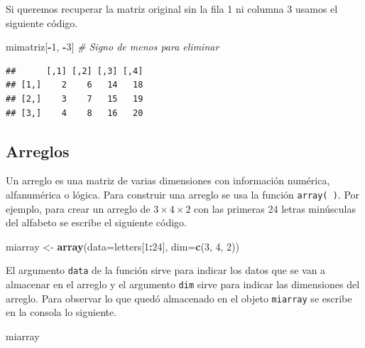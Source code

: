 \documentclass[10pt,]{krantz}
\makeatletter
\newenvironment{Shaded}{\begin{snugshade}}{\end{snugshade}}
\newcommand{\KeywordTok}[1]{\textcolor[rgb]{0.13,0.29,0.53}{\textbf{#1}}}
\newcommand{\DataTypeTok}[1]{\textcolor[rgb]{0.13,0.29,0.53}{#1}}
\newcommand{\DecValTok}[1]{\textcolor[rgb]{0.00,0.00,0.81}{#1}}
\newcommand{\StringTok}[1]{\textcolor[rgb]{0.31,0.60,0.02}{#1}}
\newcommand{\CommentTok}[1]{\textcolor[rgb]{0.56,0.35,0.01}{\textit{#1}}}
\newcommand{\OperatorTok}[1]{\textcolor[rgb]{0.81,0.36,0.00}{\textbf{#1}}}
\newcommand{\NormalTok}[1]{#1}
\newenvironment{kframe}{%
\medskip{}
\setlength{\fboxsep}{.8em}
 \def\at@end@of@kframe{}%
 \ifinner\ifhmode%
  \def\at@end@of@kframe{\end{minipage}}%
  \begin{minipage}{\columnwidth}%
 \fi\fi%
 \def\FrameCommand##1{\hskip\@totalleftmargin \hskip-\fboxsep
 \colorbox{shadecolor}{##1}\hskip-\fboxsep
     \hskip-\linewidth \hskip-\@totalleftmargin \hskip\columnwidth}%
 \MakeFramed {\advance\hsize-\width
   \@totalleftmargin\z@ \linewidth\hsize
   \@setminipage}}%
 {\par\unskip\endMakeFramed%
 \at@end@of@kframe}
\renewenvironment{Shaded}{\begin{kframe}}{\end{kframe}}
\makeatother
\begin{document}
Si queremos recuperar la matriz original sin la fila 1 ni columna 3
usamos el siguiente código.

\begin{Shaded}
\begin{Highlighting}[]
\NormalTok{mimatriz[}\OperatorTok{-}\DecValTok{1}\NormalTok{, }\OperatorTok{-}\DecValTok{3}\NormalTok{]  }\CommentTok{# Signo de menos para eliminar}
\end{Highlighting}
\end{Shaded}

\begin{verbatim}
##      [,1] [,2] [,3] [,4]
## [1,]    2    6   14   18
## [2,]    3    7   15   19
## [3,]    4    8   16   20
\end{verbatim}

\subsection{\texorpdfstring{Arreglos 
}{Arreglos  }}\label{arreglos}

Un arreglo es una matriz de varias dimensiones con información numérica,
alfanumérica o lógica. Para construir una arreglo se usa la función
\texttt{array(\ )}. Por ejemplo, para crear un arreglo de
\(3 \times 4 \times 2\) con las primeras 24 letras minúsculas del
alfabeto se escribe el siguiente código.

\begin{Shaded}
\begin{Highlighting}[]
\NormalTok{miarray <-}\StringTok{ }\KeywordTok{array}\NormalTok{(}\DataTypeTok{data=}\NormalTok{letters[}\DecValTok{1}\OperatorTok{:}\DecValTok{24}\NormalTok{], }\DataTypeTok{dim=}\KeywordTok{c}\NormalTok{(}\DecValTok{3}\NormalTok{, }\DecValTok{4}\NormalTok{, }\DecValTok{2}\NormalTok{))}
\end{Highlighting}
\end{Shaded}

El argumento \texttt{data} de la función sirve para indicar los datos
que se van a almacenar en el arreglo y el argumento \texttt{dim} sirve
para indicar las dimensiones del arreglo. Para observar lo que quedó
almacenado en el objeto \texttt{miarray} se escribe en la consola lo
siguiente.

\begin{Shaded}
\begin{Highlighting}[]
\NormalTok{miarray}
\end{Highlighting}
\end{Shaded}
\end{document}
